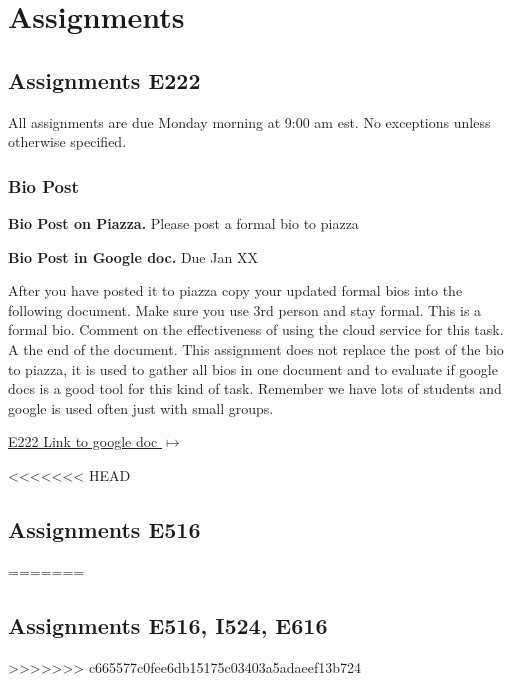 \chapter{Assignments}\label{c:assignments}

\section{Assignments E222}
\label{s:e222-assignments}

All assignments are due Monday morning at 9:00 am est. No exceptions unless otherwise specified.  

\subsection{Bio Post}

\begin{exercise}\label{a:e222-bio-piazza}

{\bf Bio Post on Piazza.} Please post a formal bio to piazza

\end{exercise}
 
\begin{exercise} \label{a:e222-bio-googledocs}

{\bf Bio Post in Google doc.} Due Jan XX

After you have posted it to piazza copy your updated formal bios into the following document.  Make sure you use 3rd person and stay formal. This is a formal bio. Comment on the effectiveness of using the cloud service for this task. A the end of the document. This assignment does not replace the post of the bio to piazza, it is used to gather all bios in one document and to evaluate if google docs is a good tool for this kind of task. Remember we have lots of students and google is used often just with small groups.
 
 \smallskip

 {\hfill \href{https://docs.google.com/document/d/1ejzlKYqC3dLac8WXVpcPQsJh1j4BDqRxxgGg1cFQbeQ/edit?usp=sharing}{E222 Link to google doc $\mapsto$}}

\end{exercise}

<<<<<<< HEAD
\section{Assignments E516}\label{s:e516-assignments}
=======
\section{Assignments E516, I524, E616}
\label{s:e516/524/616-assignments}
>>>>>>> c665577c0fee6db15175c03403a5adaeef13b724


